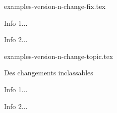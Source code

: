 \begin{filecontents*}{examples-version-n-change-fix.tex}
\begin{bdocfix}
    \item Info 1...
    \item Info 2...
\end{bdocfix}


\end{filecontents*}


\begin{filecontents*}{examples-version-n-change-topic.tex}
\begin{bdoctopic}{Des changements inclassables}
    \item Info 1...
    \item Info 2...
\end{bdoctopic}

\end{filecontents*}



\documentclass[10pt, a4paper]{article}

\usepackage[utf8]{inputenc}
\usepackage[T1]{fontenc}

\usepackage[french]{babel, varioref}

\usepackage{enumitem}

\usepackage[lang = french]{bdoc}




                       { O{ Début du rendu dans cette doc. }
                         O{ Fin du rendu dans cette doc. } }{
        \bdocdocextraruler{#1}
        \smallskip
}{
        \smallskip
        \bdocdocextraruler{#2}
}





